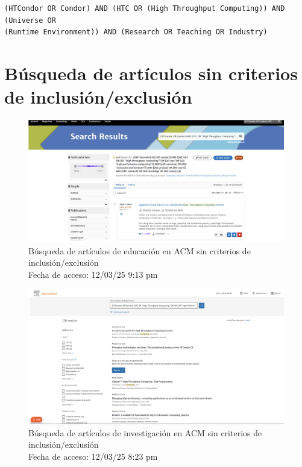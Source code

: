\begin{tcolorbox}[
		colback=gray!5,
		colframe=black!60,
		title=Cadena de búsqueda en Taylor \& Francis,
		fonttitle=\bfseries,
		sharp corners=south
	]
	\scriptsize
	\begin{verbatim}
(HTCondor OR Condor) AND (HTC OR (High Throughput Computing)) AND (Universe OR 
(Runtime Environment)) AND (Research OR Teaching OR Industry)
  \end{verbatim}
\end{tcolorbox}


\section{Búsqueda de artículos sin criterios de inclusión/exclusión}\label{sec:busqueda-sin-criterios}


\begin{figure}[H]
	\centering
	\includegraphics[width=\textwidth,keepaspectratio]{apendices/bases-datos/sin-exclusion/acm.png}
	\caption{Búsqueda de artículos de educación en ACM sin criterios de inclusión/exclusión \\
		Fecha de acceso: 12/03/25 9:13 pm
	}\label{fig:busqueda-acm-no-exclusion}
\end{figure}

\FloatBarrier

\begin{figure}[H]
	\centering
	\includegraphics[width=\textwidth,keepaspectratio]{apendices/bases-datos/sin-exclusion/science-direct.png}
	\caption{Búsqueda de artículos de investigación en ACM sin criterios de inclusión/exclusión \\
		Fecha de acceso: 12/03/25 8:23 pm
	}\label{fig:busqueda-science-direct-no-exclusion}
\end{figure}

